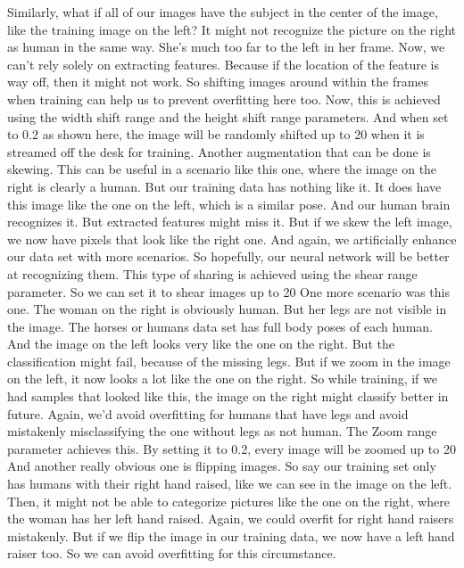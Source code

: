 Similarly, what if all of our images have
the subject in the center of the image, like the training image on the left?
It might not recognize the picture on the right as human in the same way.
She's much too far to the left in her frame.
Now, we can't rely solely on extracting features.
Because if the location of the feature is way off, then it might not work.
So shifting images around within the frames when training can help
us to prevent overfitting here too.
Now, this is achieved using the width shift range and the height shift range
parameters.
And when set to 0.2 as shown here, the image
will be randomly shifted up to 20%
when it is streamed off the desk for training.
Another augmentation that can be done is skewing.
This can be useful in a scenario like this one, where the image on the right
is clearly a human.
But our training data has nothing like it.
It does have this image like the one on the left, which is a similar pose.
And our human brain recognizes it.
But extracted features might miss it.
But if we skew the left image, we now have
pixels that look like the right one.
And again, we artificially enhance our data set with more scenarios.
So hopefully, our neural network will be better at recognizing them.
This type of sharing is achieved using the shear range parameter.
So we can set it to shear images up to 20%
One more scenario was this one.
The woman on the right is obviously human.
But her legs are not visible in the image.
The horses or humans data set has full body poses of each human.
And the image on the left looks very like the one on the right.
But the classification might fail, because of the missing legs.
But if we zoom in the image on the left, it now
looks a lot like the one on the right.
So while training, if we had samples that looked like this,
the image on the right might classify better in future.
Again, we'd avoid overfitting for humans that have legs
and avoid mistakenly misclassifying the one without legs as not human.
The Zoom range parameter achieves this.
By setting it to 0.2, every image will be zoomed up to 20%
And another really obvious one is flipping images.
So say our training set only has humans with their right hand raised, like we
can see in the image on the left.
Then, it might not be able to categorize pictures
like the one on the right, where the woman has her left hand raised.
Again, we could overfit for right hand raisers mistakenly.
But if we flip the image in our training data,
we now have a left hand raiser too.
So we can avoid overfitting for this circumstance.
